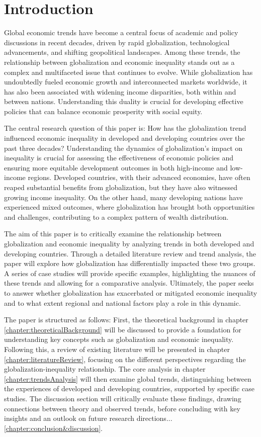 \chapter{Introduction}\label{chapter:introduction}

Global economic trends have become a central focus of academic and policy discussions in recent decades, driven by rapid globalization, technological advancements, and shifting geopolitical landscapes. Among these trends, the relationship between globalization and economic inequality stands out as a complex and multifaceted issue that continues to evolve. While globalization has undoubtedly fueled economic growth and interconnected markets worldwide, it has also been associated with widening income disparities, both within and between nations. Understanding this duality is crucial for developing effective policies that can balance economic prosperity with social equity.

The central research question of this paper is: How has the globalization trend influenced economic inequality in developed and developing countries over the past three decades? Understanding the dynamics of globalization’s impact on inequality is crucial for assessing the effectiveness of economic policies and ensuring more equitable development outcomes in both high-income and low-income regions. Developed countries, with their advanced economies, have often reaped substantial benefits from globalization, but they have also witnessed growing income inequality. On the other hand, many developing nations have experienced mixed outcomes, where globalization has brought both opportunities and challenges, contributing to a complex pattern of wealth distribution.

The aim of this paper is to critically examine the relationship between globalization and economic inequality by analyzing trends in both developed and developing countries. Through a detailed literature review and trend analysis, the paper will explore how globalization has differentially impacted these two groups. A series of case studies will provide specific examples, highlighting the nuances of these trends and allowing for a comparative analysis. Ultimately, the paper seeks to answer whether globalization has exacerbated or mitigated economic inequality and to what extent regional and national factors play a role in this dynamic.

The paper is structured as follows: First, the theoretical background in chapter \ref{chapter:theoreticalBackground} will be discussed to provide a foundation for understanding key concepts such as globalization and economic inequality. Following this, a review of existing literature will be presented in chapter \ref{chapter:literatureReview}, focusing on the different perspectives regarding the globalization-inequality relationship. The core analysis in chapter \ref{chapter:trendsAnalysis} will then examine global trends, distinguishing between the experiences of developed and developing countries, supported by specific case studies. The discussion section will critically evaluate these findings, drawing connections between theory and observed trends, before concluding with key insights and an outlook on future research directions... \ref{chapter:conclusion&discussion}.


